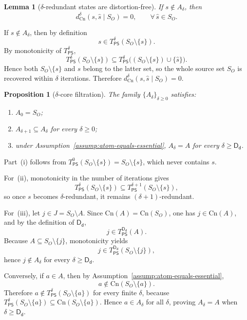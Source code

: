 \documentclass[journal,onecolumn]{IEEEtran}
\makeatletter
\newcommand{\Cn}{\text{Cn}}
\newtheorem{lemma}{Lemma}[section]
\newtheorem{proposition}{Proposition}[section]
\numberwithin{equation}{section}
\renewenvironment{proof}[1][\proofname]{\par
  \pushQED{\qed}%
  \normalfont \topsep6\p@\@plus6\p@\relax
  \trivlist
  \item[\hskip\labelsep
        \itshape
    #1\@addpunct{.}]\ignorespaces
}{%
  \popQED\endtrivlist\@endpefalse
}
\makeatother
\begin{document}
\begin{lemma}[\(\delta\)-redundant states are distortion-free]
\label{lem:delta-free-substitution}
If \(s\notin A_\delta\), then
\[
  d_{\Cn}^{\delta}(s,\hat s\mid S_O)=0,
  \qquad \forall\,\hat s\in\hat S_O.
\]
\end{lemma}

\begin{proof}
If \(s\notin A_\delta\), then by definition
\[
  s\in T_{\mathsf{PS}}^\delta(S_O\setminus\{s\}).
\]
By monotonicity of \(T_{\mathsf{PS}}^\delta\),
\[
  T_{\mathsf{PS}}^\delta(S_O\setminus\{s\})
  \subseteq
  T_{\mathsf{PS}}^\delta\bigl((S_O\setminus\{s\})\cup\{\hat s\}\bigr).
\]
Hence both \(S_O\setminus\{s\}\) and \(s\) belong to the latter
set, so the whole source set \(S_O\) is recovered within
\(\delta\) iterations.
Therefore \(d_{\Cn}^{\delta}(s,\hat s\mid S_O)=0\).
\end{proof}

\begin{proposition}[\(\delta\)-core filtration]
\label{prop:filtration}
The family \(\{A_\delta\}_{\delta\ge 0}\) satisfies:
\begin{enumerate}[label=\textup{(\roman*)}]
  \item \(A_0=S_O\);
  \item \(A_{\delta+1}\subseteq A_\delta\) for every
        \(\delta\ge 0\);
  \item under Assumption~\ref{assump:atom-equals-essential},
        \(A_\delta=A\) for every \(\delta\ge \mathsf{D_d}\).
\end{enumerate}
\end{proposition}

\begin{proof}
Part~\textup{(i)} follows from
\(T_{\mathsf{PS}}^0(S_O\setminus\{s\})=S_O\setminus\{s\}\), which
never contains \(s\).

For~\textup{(ii)}, monotonicity in the number of iterations gives
\[
  T_{\mathsf{PS}}^\delta(S_O\setminus\{s\})
  \subseteq
  T_{\mathsf{PS}}^{\delta+1}(S_O\setminus\{s\}),
\]
so once \(s\) becomes \(\delta\)-redundant, it remains
\((\delta+1)\)-redundant.

For~\textup{(iii)}, let \(j\in J=S_O\setminus A\).
Since \(\Cn(A)=\Cn(S_O)\), one has \(j\in\Cn(A)\), and by the
definition of \(\mathsf{D_d}\),
\[
  j\in T_{\mathsf{PS}}^{\mathsf{D_d}}(A).
\]
Because \(A\subseteq S_O\setminus\{j\}\), monotonicity yields
\[
  j\in T_{\mathsf{PS}}^{\mathsf{D_d}}(S_O\setminus\{j\}),
\]
hence \(j\notin A_\delta\) for every \(\delta\ge \mathsf{D_d}\).

Conversely, if \(a\in A\), then by
Assumption~\ref{assump:atom-equals-essential},
\[
  a\notin \Cn(S_O\setminus\{a\}).
\]
Therefore \(a\notin T_{\mathsf{PS}}^\delta(S_O\setminus\{a\})\) for
every finite \(\delta\), because
\(T_{\mathsf{PS}}^\delta(S_O\setminus\{a\})
 \subseteq \Cn(S_O\setminus\{a\})\).
Hence \(a\in A_\delta\) for all \(\delta\), proving
\(A_\delta=A\) when \(\delta\ge \mathsf{D_d}\).
\end{proof}
\end{document}
